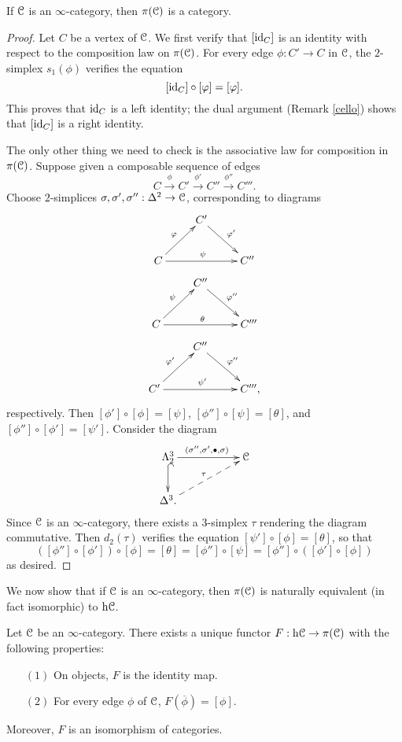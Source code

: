 \begin{1.2.3 The homotopy category}
\begin{proposition}
If $\operatorname{\mathcal{C}}$ is an $\infty$-category, then $\pi(\operatorname{\mathcal{C}})$ is a category.
\end{proposition}

\begin{proof}
Let $C$ be a vertex of $\operatorname{\mathcal{C}}$. We first verify that $[\operatorname{id}_{C}]$ is an identity with respect to the composition law on $\pi(\operatorname{\mathcal{C}})$. For every edge $\phi: C' \rightarrow C$ in $\operatorname{\mathcal{C}}$, the
$2$-simplex $s_1(\phi)$ verifies the equation
$$ [ \operatorname{id}_{C} ] \circ [\varphi] = [\varphi].$$
This proves that $\operatorname{id}_{C}$ is a left
identity; the dual argument (Remark \ref{cello}) shows that $[\operatorname{id}_{C}]$ is a right
identity.

The only other thing we need to check is the associative law for
composition in $\pi(\operatorname{\mathcal{C}})$. Suppose given a composable sequence of edges
$$ C \stackrel{\phi}{\rightarrow} C' \stackrel{\phi'}{\rightarrow} C'' \stackrel{\phi''}{\rightarrow} C'''.$$
Choose $2$-simplices $\sigma, \sigma', \sigma'': \Delta^2 \rightarrow \operatorname{\mathcal{C}}$, corresponding to diagrams
$$ \xymatrix{ & C' \ar[dr]^{\phi'} & \\
C \ar[ur]^{\phi} \ar[rr]^{\psi} & & C'' }$$
$$ \xymatrix{ & C'' \ar[dr]^{\phi''} & \\
C \ar[ur]^{\psi} \ar[rr]^{\theta} & & C''' }$$
$$ \xymatrix{ & C'' \ar[dr]^{\phi''} & \\
C' \ar[ur]^{\phi'} \ar[rr]^{\psi'} & & C''',}$$
respectively. Then $[\phi'] \circ [\phi] = [\psi]$, $[\phi''] \circ [\psi] = [\theta]$, and
$[\phi''] \circ [\phi'] = [\psi']$. Consider the diagram
$$ \xymatrix{
\Lambda^3_2 \ar[rr]^{(\sigma'', \sigma', \bigdot, \sigma)} \ar@{^{(}->}[d] & & \calC \\
\Delta^3. \ar@{-->}[urr]^{\tau} & & }$$
Since $\operatorname{\mathcal{C}}$ is an $\infty$-category, there exists a $3$-simplex $\tau$ rendering the diagram commutative. Then $d_2(\tau)$ verifies the equation
$[\psi'] \circ [\phi] = [\theta]$, so that
$$([\phi''] \circ [\phi']) \circ [\phi] = [\theta] = [\phi''] \circ
[\psi] = [\phi''] \circ ([\phi'] \circ [\phi])$$ as desired.
\end{proof}

We now show that if $\operatorname{\mathcal{C}}$ is an $\infty$-category, then $\pi(\operatorname{\mathcal{C}})$ is
naturally equivalent (in fact isomorphic) to $\rm{h} \it{\operatorname{\mathcal{C}}}$.

\begin{proposition}
Let $\operatorname{\mathcal{C}}$ be an $\infty$-category. There exists a unique functor $F: \rm{h} \it{\operatorname{\mathcal{C}}} \rightarrow \pi(\operatorname{\mathcal{C}})$ with the following properties:
\begin{itemize}
\item[$(1)$] On objects, $F$ is the identity map.
\item[$(2)$] For every edge $\phi$ of $\operatorname{\mathcal{C}}$, $F( \overline{\phi} ) = [\phi]$.
\end{itemize}
Moreover, $F$ is an isomorphism of categories.
\end{proposition}


\end{1.2.3 The homotopy category}

